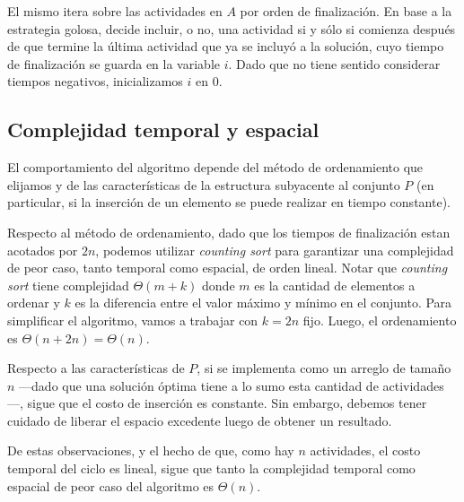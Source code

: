 

El mismo itera sobre las actividades en $A$ por orden de finalización. En base a la estrategia golosa, decide incluir, o no, una actividad si y sólo si comienza después de que termine la última actividad que ya se incluyó a la solución, cuyo tiempo de finalización se guarda en la variable $i$. Dado que no tiene sentido considerar tiempos negativos, inicializamos $i$ en $0$.

\subsection{Complejidad temporal y espacial} El comportamiento del algoritmo depende del método de ordenamiento que elijamos y de las características de la estructura subyacente al conjunto $P$ (en particular, si la inserción de un elemento se puede realizar en tiempo constante). 

Respecto al método de ordenamiento, dado que los tiempos de finalización estan acotados por $2n$, podemos utilizar \textit{counting sort} para garantizar una complejidad de peor caso, tanto temporal como espacial, de orden lineal. Notar que \textit{counting sort} tiene complejidad $\Theta(m + k)$ donde $m$ es la cantidad de elementos a ordenar y $k$ es la diferencia entre el valor máximo y mínimo en el conjunto. Para simplificar el algoritmo, vamos a trabajar con $k = 2n$ fijo. Luego, el ordenamiento es $\Theta(n + 2n) = \Theta(n)$.

Respecto a las características de $P$, si se implementa como un arreglo de tamaño $n$ ---dado que una solución óptima tiene a lo sumo esta cantidad de actividades---, sigue que el costo de inserción es constante. Sin embargo, debemos tener cuidado de liberar el espacio excedente luego de obtener un resultado.

De estas observaciones, y el hecho de que, como hay $n$ actividades, el costo temporal del ciclo es lineal, sigue que tanto la complejidad temporal como espacial de peor caso del algoritmo es $\Theta(n)$.